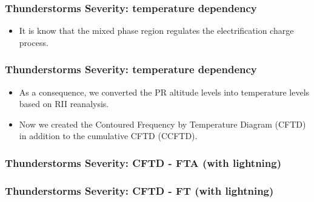 \documentclass[smaller]{beamer}
\begin{document}

\begin{frame}
\frametitle{Thunderstorms Severity: temperature dependency}

\begin{itemize}
\item It is know that the mixed phase region regulates the electrification charge process. 
\end{itemize}

\end{frame}

\begin{frame}
\frametitle{Thunderstorms Severity: temperature dependency}
\begin{itemize}
\item As a consequence, we converted the PR altitude levels into temperature levels based on RII reanalysis.
\item Now we created the Contoured Frequency by Temperature Diagram (CFTD) in addition to the cumulative CFTD (CCFTD).
\end{itemize}

\end{frame}






\begin{frame}
\frametitle{Thunderstorms Severity: CFTD - FTA (with lightning) }

\end{frame}
\begin{frame}
\frametitle{Thunderstorms Severity: CFTD - FT (with lightning)}

\end{frame}
\end{document}
